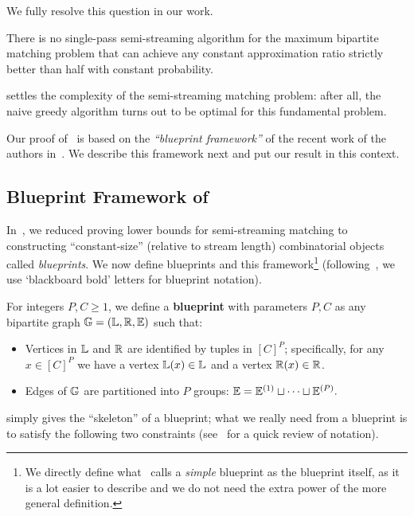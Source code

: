 We fully resolve this question in our work. 

\begin{Theorem}\label{thm:main}
	There is no single-pass semi-streaming algorithm for the maximum bipartite matching problem that can achieve any constant approximation ratio strictly better than half with constant probability. 
\end{Theorem}

 settles the complexity of the semi-streaming matching problem: after all, the naive greedy algorithm turns out to be optimal for this fundamental problem. 

Our proof of~ is based on the \emph{``blueprint framework''} of the recent work of the authors in~\cite{AssadiJX26}. We describe this framework next and put our result in this context. 


\subsection{Blueprint Framework of~\cite{AssadiJX26}} 

In~\cite{AssadiJX26}, we reduced proving lower bounds for semi-streaming matching to constructing ``constant-size'' (relative to stream length) combinatorial
objects called \emph{blueprints}. We now define blueprints and this framework\footnote{We directly define what~\cite{AssadiJX26} calls a \emph{simple} blueprint as the blueprint itself, 
as it is a lot easier to describe and we do not need the extra power of the more general definition.}
(following~\cite{AssadiJX26}, we use `blackboard bold' letters for blueprint notation). 


\begin{definition}\label{def:blueprint}
    For integers $P,C \geq 1$, we define a \textbf{blueprint} with parameters $P,C$ as any bipartite graph $\mathbb{G}=(\mathbb{L},\mathbb{R},\mathbb{E})$ such that: 
    \begin{itemize}
    \item Vertices in $\mathbb{L}$ and $\mathbb{R}$ are identified by tuples in $[C]^P$; specifically, for any $x \in [C]^P$ we have a vertex $\mathbb{L}(x) \in \mathbb{L}$ and a vertex $\mathbb{R}(x) \in \mathbb{R}$. 
    \item Edges of $\mathbb{G}$ are partitioned into $P$ groups:
    $
      \mathbb{E} = \mathbb{E}^{(1)} \sqcup \cdots \sqcup \mathbb{E}^{(P)}.
    $
    \end{itemize}
\end{definition}
 simply gives the ``skeleton'' of a blueprint; what we really need from a blueprint is to satisfy the following two constraints (see~ for a quick review of notation).  

